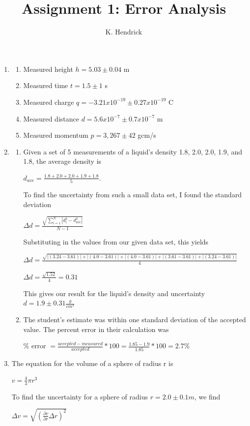 \documentclass[]{article}
\title{Assignment 1:  Error Analysis}
\author{K. Hendrick}
\date{}
\begin{document}
\maketitle


\begin{enumerate}
\item
\begin{enumerate}[label=(\alph*)]
\item Measured height $ h = 5.03 \pm 0.04$ m
\item Measured time $ t = 1.5 \pm 1 $ s
\item Measured charge $ q = -3.21x10^{-19} \pm 0.27x10^{-19}$ C
\item Measured distance $ d = 5.6x10^{-7} \pm 0.7x10^{-7} $ m
\item Measured momentum $ p = 3,267 \pm 42 $ gcm/s

\end{enumerate}
\item
\begin{enumerate}[label=(\alph*)]
\item Given a set of 5 measurements of a liquid's density 1.8, 2.0, 2.0, 1.9, and 1.8, the average density is

 \begin{center}$d_{ave} = \frac{1.8+2.0+2.0+1.9+1.8}{5}$. 
 \end{center}
 
To find the uncertainty from such a small data set, I found the standard deviation

\begin{center}
$\Delta d = \frac{\sqrt{\sum_{i=1}^{N}|d_i^2 - d_{ave}^2|}}{N-1} $
\end{center}
Substituting in the values from our given data set, this yields

\begin{center}
$\Delta d = \frac{\sqrt{|(3.24-3.61)| + |(4.0-3.61)| + |(4.0-3.61)| + |(3.61-3.61)| + |(3.24-3.61)|}}{4} $

$\Delta d = \frac{\sqrt{1.52}}{4} = 0.31$

This gives our result for the liquid's density and uncertainty $ d = 1.9 \pm 0.31 \frac{g}{cm^3}$
\end{center}
\item The student's estimate was within one standard deviation of the accepted value. The percent error in their calculation was 

\begin{center}
\% error $= \frac{accepted - measured}{accepted}*100 = \frac{1.85-1.9}{1.85}*100 =2.7\%$ 
\end{center}
\end{enumerate}
\item
The equation for the volume of a sphere of radius r is 
\begin{center}
$v = \frac{4}{3}\pi r^3$
\end{center}
To find the uncertainty for a sphere of radius $r = 2.0 \pm 0.1 m$, we find 
\begin{center}
$\Delta v = \sqrt{(\frac{\partial v}{\partial r} \Delta r)^2}$ 
\end{center}


\end{enumerate}
\end{document}
